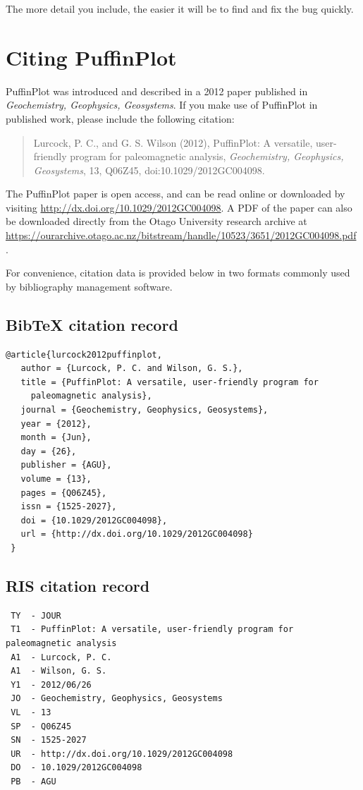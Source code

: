 \documentclass[a4paper,british]{article}
\begin{document}
\noindent The more detail you include, the easier it will be to find and
fix the bug quickly.

\clearpage
\section{Citing PuffinPlot\label{sec:citing-puffinplot}}

PuffinPlot was introduced and described in a 2012 paper published
in \emph{Geochemistry, Geophysics, Geosystems}. If you make use of
PuffinPlot in published work, please include the following citation:

\begin{quote}
Lurcock, P. C., and G. S. Wilson (2012), PuffinPlot: A versatile,
user-friendly program for paleomagnetic analysis, \emph{Geochemistry,
  Geophysics, Geosystems}, 13, Q06Z45, doi:10.1029/2012GC004098.
\end{quote}

\noindent The PuffinPlot paper is open access, and can be read online or
downloaded by visiting \url{http://dx.doi.org/10.1029/2012GC004098}. A
PDF of the paper can also be downloaded directly from the Otago
University research archive at
\url{https://ourarchive.otago.ac.nz/bitstream/handle/10523/3651/2012GC004098.pdf
}.

For convenience, citation data is provided below in two formats commonly
used by bibliography management software.

\subsection*{BibTeX citation record}
\small
\begin{verbatim}
@article{lurcock2012puffinplot,
   author = {Lurcock, P. C. and Wilson, G. S.},
   title = {PuffinPlot: A versatile, user-friendly program for
     paleomagnetic analysis},
   journal = {Geochemistry, Geophysics, Geosystems},
   year = {2012},
   month = {Jun},
   day = {26},
   publisher = {AGU},
   volume = {13},
   pages = {Q06Z45},
   issn = {1525-2027},
   doi = {10.1029/2012GC004098},
   url = {http://dx.doi.org/10.1029/2012GC004098}
 }
\end{verbatim}

\subsection*{RIS citation record}
\small
\begin{verbatim}
 TY  - JOUR
 T1  - PuffinPlot: A versatile, user-friendly program for paleomagnetic analysis
 A1  - Lurcock, P. C.
 A1  - Wilson, G. S.
 Y1  - 2012/06/26
 JO  - Geochemistry, Geophysics, Geosystems
 VL  - 13
 SP  - Q06Z45
 SN  - 1525-2027
 UR  - http://dx.doi.org/10.1029/2012GC004098
 DO  - 10.1029/2012GC004098
 PB  - AGU
\end{verbatim}
\end{document}
